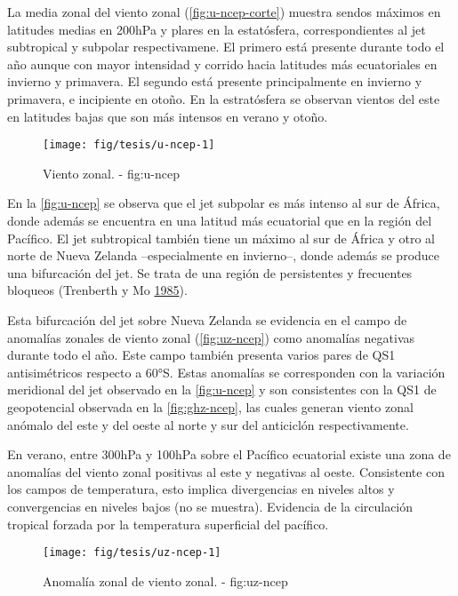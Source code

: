 \documentclass[spanish,a4paper]{book}
\begin{document}
La media zonal del viento zonal (\autoref{fig:u-ncep-corte}) muestra
sendos máximos en latitudes medias en 200hPa y plares en la estatósfera,
correspondientes al jet subtropical y subpolar respectivamene. El
primero está presente durante todo el año aunque con mayor intensidad y
corrido hacia latitudes más ecuatoriales en invierno y primavera. El
segundo está presente principalmente en invierno y primavera, e
incipiente en otoño. En la estratósfera se observan vientos del este en
latitudes bajas que son más intensos en verano y otoño.

\begin{figure}

{\centering \texttt{[image: fig/tesis/u-ncep-1]} 

}

\caption{Viento zonal. - fig:u-ncep}\label{fig:u-ncep}
\end{figure}

En la \autoref{fig:u-ncep} se observa que el jet subpolar es más intenso
al sur de África, donde además se encuentra en una latitud más
ecuatorial que en la región del Pacífico. El jet subtropical también
tiene un máximo al sur de África y otro al norte de Nueva Zelanda
--especialmente en invierno--, donde además se produce una bifurcación
del jet. Se trata de una región de persistentes y frecuentes bloqueos
(Trenberth y Mo \protect\hyperlink{ref-Trenberth1985}{1985}).

Esta bifurcación del jet sobre Nueva Zelanda se evidencia en el campo de
anomalías zonales de viento zonal (\autoref{fig:uz-ncep}) como anomalías
negativas durante todo el año. Este campo también presenta varios pares
de QS1 antisimétricos respecto a 60°S. Estas anomalías se corresponden
con la variación meridional del jet observado en la \autoref{fig:u-ncep}
y son consistentes con la QS1 de geopotencial observada en la
\autoref{fig:ghz-ncep}, las cuales generan viento zonal anómalo del este
y del oeste al norte y sur del anticiclón respectivamente.

En verano, entre 300hPa y 100hPa sobre el Pacífico ecuatorial existe una
zona de anomalías del viento zonal positivas al este y negativas al
oeste. Consistente con los campos de temperatura, esto implica
divergencias en niveles altos y convergencias en niveles bajos (no se
muestra). Evidencia de la circulación tropical forzada por la
temperatura superficial del pacífico.

\begin{figure}

{\centering \texttt{[image: fig/tesis/uz-ncep-1]} 

}

\caption{Anomalía zonal de viento zonal. - fig:uz-ncep}\label{fig:uz-ncep}
\end{figure}
\end{document}
